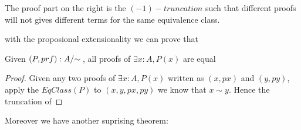 The proof part on the right is the $(-1)-truncation$ such that
different proofs will not gives different terms for the same
equivalence class.


with the proposional extensionality we can prove that
\begin{theorem}\label{thm-p-e}
Given $(P , prf) : \qset{A}$, all proofs of $\exists x : A, P (x)$ are equal
\end{theorem}

\begin{proof}
Given any two proofs of $\exists x : A, P (x)$ written as $(x , px)$ and $(y
, py)$, apply the $EqClass(P)$ to $(x, y, px, py)$ we know that $x
\sim y$. Hence the truncation of 
\end{proof}












Moreover we have another suprising theorem:


